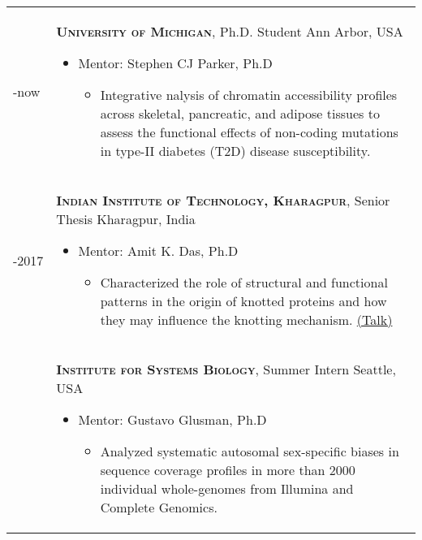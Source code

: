 \documentclass[11pt, letterpaper, oneside]{article}
\newcommand{\shorty}[1]{
  {\sectionfont\scshape\bfseries #1}}
\newenvironment{innerlist}[1][\enskip\textbullet]%
{\begin{itemize}[#1,leftmargin=0pt,parsep=0pt,itemsep=0pt,topsep=0pt,partopsep=0pt]}
{\end{itemize}}
\begin{document}
\begin{tabularx}{\textwidth}{>{\hsize=0.15\hsize}XX}
2017-now & \shorty{University of Michigan}, Ph.D. Student \hfill Ann Arbor, USA
        \begin{innerlist}
       	  \item[] Mentor: Stephen CJ Parker, Ph.D
          	\begin{itemize}
        		\item Integrative nalysis of chromatin accessibility profiles across skeletal, pancreatic, and adipose tissues to assess the functional effects of non-coding mutations in type-II diabetes (T2D) disease susceptibility.
      		\end{itemize}
        \end{innerlist} \\
2016-2017 & \shorty{Indian Institute of Technology, Kharagpur}, Senior Thesis \hfill Kharagpur, India
        \begin{innerlist}
       	  \item[] Mentor: Amit K. Das, Ph.D
          	\begin{itemize}
        		\item Characterized the role of structural and functional patterns %
        		in the origin of knotted proteins and how they may influence the knotting mechanism. \href{https://vivekiitkgp.github.io/science/journal-club-1.html}{\small(Talk)}
      		\end{itemize}
        \end{innerlist} \\
2016 & \shorty{Institute for Systems Biology}, Summer Intern \hfill  Seattle, USA
        \begin{innerlist}
          \setlength{\itemsep}{1pt}
          \item[] Mentor: Gustavo Glusman, Ph.D
          	\begin{itemize}[]
          	    \item Analyzed systematic autosomal sex-specific biases in sequence coverage profiles in more than 2000 individual whole-genomes from Illumina and Complete Genomics.

\end{itemize}
\end{innerlist}
\end{tabularx}
\end{document}
